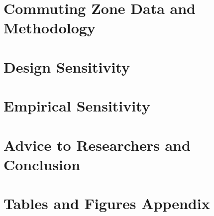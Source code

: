 \documentclass[12pt]{article}
\begin{document}
\section{Commuting Zone Data and Methodology \label{sec:method}}


\section{Design Sensitivity \label{sec:dsens}}


\section{Empirical Sensitivity \label{sec:esens}}


\section{Advice to Researchers and Conclusion \label{sec:conclusion}}


\clearpage
\singlespacing




\newpage
\appendix
\section*{Tables and Figures Appendix}
\FloatBarrier


\end{document}
